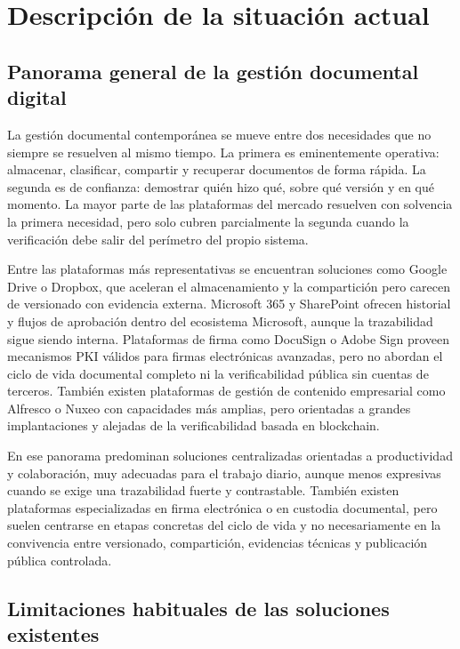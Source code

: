 \documentclass[11pt, a4paper]{article}
\begin{document}
\section{Descripción de la situación actual}

\subsection{Panorama general de la gestión documental digital}

La gestión documental contemporánea se mueve entre dos necesidades que no siempre se resuelven al mismo tiempo. La primera es eminentemente operativa: almacenar, clasificar, compartir y recuperar documentos de forma rápida. La segunda es de confianza: demostrar quién hizo qué, sobre qué versión y en qué momento. La mayor parte de las plataformas del mercado resuelven con solvencia la primera necesidad, pero solo cubren parcialmente la segunda cuando la verificación debe salir del perímetro del propio sistema.

Entre las plataformas más representativas se encuentran soluciones como Google Drive o Dropbox, que aceleran el almacenamiento y la compartición pero carecen de versionado con evidencia externa. Microsoft 365 y SharePoint ofrecen historial y flujos de aprobación dentro del ecosistema Microsoft, aunque la trazabilidad sigue siendo interna. Plataformas de firma como DocuSign o Adobe Sign proveen mecanismos PKI válidos para firmas electrónicas avanzadas, pero no abordan el ciclo de vida documental completo ni la verificabilidad pública sin cuentas de terceros. También existen plataformas de gestión de contenido empresarial como Alfresco o Nuxeo con capacidades más amplias, pero orientadas a grandes implantaciones y alejadas de la verificabilidad basada en blockchain.

En ese panorama predominan soluciones centralizadas orientadas a productividad y colaboración, muy adecuadas para el trabajo diario, aunque menos expresivas cuando se exige una trazabilidad fuerte y contrastable. También existen plataformas especializadas en firma electrónica o en custodia documental, pero suelen centrarse en etapas concretas del ciclo de vida y no necesariamente en la convivencia entre versionado, compartición, evidencias técnicas y publicación pública controlada.

\subsection{Limitaciones habituales de las soluciones existentes}
\end{document}
